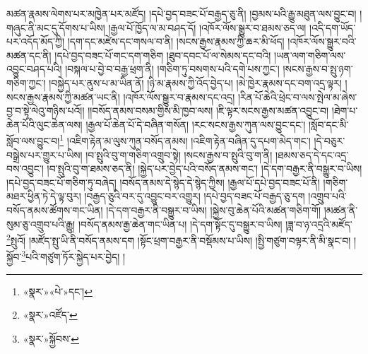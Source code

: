 མཚན་རྣམས་ལེགས་པར་མཁྱེན་པར་མཛོད། །དཔེ་བྱད་བཟང་པོ་བརྒྱད་ཅུ་ནི། །བྱམས་པའི་རྒྱུ་མཐུན་ལས་བྱུང་བ། །གཞུང་ནི་མང་དུ་དོགས་པ་ཡིས། །རྒྱལ་པོ་ཁྱོད་ལ་མ་བཤད་དོ། །འཁོར་ལོས་སྒྱུར་བ་ཐམས་ཅད་ལ། །འདི་དག་ཡོད་པར་འདོད་མོད་ཀྱི། །དག་དང་མཛེས་དང་གསལ་བ་ནི། །སངས་རྒྱས་རྣམས་ཀྱི་ཆར་མི་ཕོད། །འཁོར་ལོས་སྒྱུར་བའི་མཚན་དང་ནི། །དཔེ་བྱད་བཟང་པོ་གང་དག་གཅིག །ཐུབ་དབང་པོ་ལ་སེམས་དང་བའི། །ཡན་ལག་གཅིག་ལས་འབྱུང་བཤད་པའི། །བསྐལ་པ་བྱེ་བ་བརྒྱ་ཕྲག་ནི། །གཅིག་ཏུ་བསགས་པའི་དགེ་པས་ཀྱང་། །སངས་རྒྱས་བ་སྤུ་ཉག་གཅིག་ཀྱང་། །བསྐྱེད་པར་ནུས་པ་མ་ཡིན་ནོ། །ཉི་མ་རྣམས་ཀྱི་འོད་བྱེད་པ། །མེ་ཁྱེར་རྣམས་དང་བག་འདྲ་ལྟར། །སངས་རྒྱས་རྣམས་ཀྱི་མཚན་ཡང་ནི། །འཁོར་ལོས་སྒྱུར་བ་རྣམས་དང་འདྲ། །རིན་པོ་ཆེའི་ཕྲེང་བ་ལས་སྤེལ་མ་ཞེས་བྱ་བ་སྟེ་ལེའུ་གཉིས་པའོ།། །།བསོད་ནམས་བསམ་གྱིས་མི་ཁྱབ་ལས། །ཇི་ལྟར་སངས་རྒྱས་མཚན་འབྱུང་བ། །ཐེག་པ་ཆེན་པོའི་ལུང་ཆེན་ལས། །རྒྱལ་པོ་ཆེན་པོ་དེ་བཞིན་གསོན། །རང་སངས་རྒྱས་ཀུན་ལས་བྱུང་དང་། །སློབ་དང་མི་སློབ་ལས་བྱུང་བ།\footnote{«སྣར་»«པེ་»དང་།} །འཇིག་རྟེན་མ་ལུས་ཀུན་བསོད་ནམས། །འཇིག་རྟེན་བཞིན་དུ་དཔག་མེད་གང་། །དེ་བཅུར་བསྒྲེས་པར་གྱུར་པ་ཡིས། །བ་སྤུའི་བུ་ག་གཅིག་འགྲུབ་སྟེ། །སངས་རྒྱས་བ་སྤུའི་བུ་ག་ནི། །ཐམས་ཅད་དེ་དང་འདྲ་བས་འབྱུང་། །བ་སྤུའི་བུ་ག་ཐམས་ཅད་ནི། །སྐྱེད་པར་བྱེད་པའི་བསོད་ནམས་གང་། །དེ་དག་བརྒྱར་ནི་བསྒྱུར་བ་ཡིས། །དཔེ་བྱད་བཟང་པོ་གཅིག་ཏུ་བཞེད། །བསོད་ནམས་དེ་སྙེད་དེ་སྙེད་ཀྱིས། །རྒྱལ་པོ་དཔེ་བྱད་བཟང་པོ་ནི། །གཅིག་མཐར་ཕྱིན་ཏེ་དེ་ལྟ་བུར། །བརྒྱད་ཅུའི་བར་དུ་འབྱུང་བར་འགྱུར། །དཔེ་བྱད་བཟང་པོ་བརྒྱད་ཅུ་དག །འགྲུབ་པའི་བསོད་ནམས་ཚོགས་གང་ཡིན། །དེ་དག་བརྒྱར་ནི་བསྒྱུར་བ་ཡིས། །སྐྱེས་བུ་ཆེན་པོའི་མཚན་གཅིག་གོ། །མཚན་ནི་སུམ་ཅུ་འགྲུབ་པའི་རྒྱུ། །བསོད་ནམས་རྒྱ་ཆེན་གང་ཡིན་པ། །དེ་དག་སྟོང་དུ་བསྒྱུར་བ་ཡིས། །ཟླ་བ་ཉ་འདྲའི་མཛོད་\footnote{«སྣར་»འཛོད་}སྤུའོ། །མཛོད་སྤུ་ཡི་ནི་བསོད་ནམས་དག །སྟོང་ཕྲག་བརྒྱར་ནི་བསྡོམས་པ་ཡིས། །སྤྱི་གཙུག་བལྟར་ནི་མི་སྣང་བ། །སྐྱོབ་\footnote{«སྣར་»སྐྱོབས་}པའི་གཙུག་ཏོར་སྐྱེད་པར་བྱེད། །
